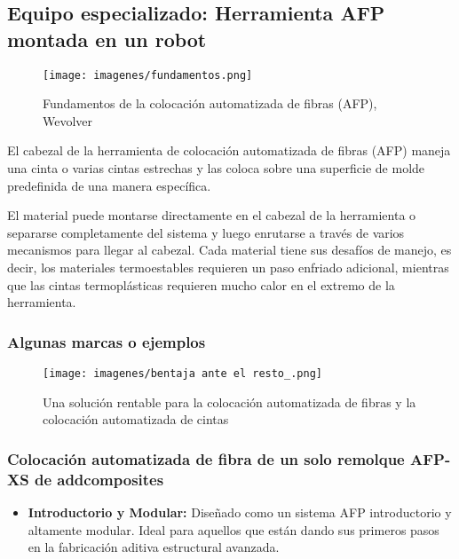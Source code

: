 \begin{enumerate}[label=\arabic*.]
\subsection{Equipo especializado: Herramienta AFP montada en un robot}

\begin{figure}[h]
    \centering
    \texttt{[image: imagenes/fundamentos.png]}
    \caption{Fundamentos de la colocación automatizada de fibras (AFP), Wevolver}
    \label{fig:enter-label}
\end{figure}



El cabezal de la herramienta de colocación automatizada de fibras (AFP) maneja una cinta o varias cintas estrechas y las coloca sobre una superficie de molde predefinida de una manera específica.  

El material puede montarse directamente en el cabezal de la herramienta o separarse completamente del sistema y luego enrutarse a través de varios mecanismos para llegar al cabezal. Cada material tiene sus desafíos de manejo, es decir, los materiales termoestables requieren un paso enfriado adicional, mientras que las cintas termoplásticas requieren mucho calor en el extremo de la herramienta.

\subsubsection{Algunas marcas o ejemplos}

\begin{figure}[h]
    \centering
    \texttt{[image: imagenes/bentaja ante el resto\_.png]}
    \caption{Una solución rentable para la colocación automatizada de fibras y la colocación automatizada de cintas}
    \label{fig:enter-label}
\end{figure}


\subsubsection{Colocación automatizada de fibra de un solo remolque AFP-XS de addcomposites}

\begin{itemize}
    \item \textbf{Introductorio y Modular:}
        Diseñado como un sistema AFP introductorio y altamente modular. Ideal para aquellos que están dando sus primeros pasos en la fabricación aditiva estructural avanzada.
    

\end{itemize}
\end{enumerate}
